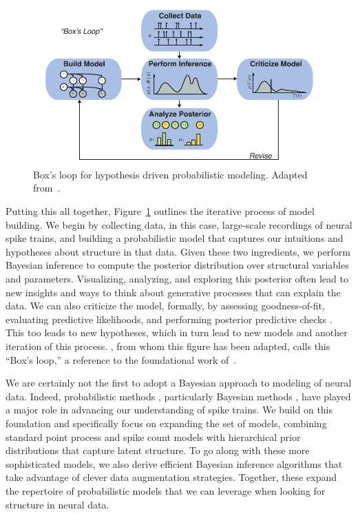 \begin{figure}[t]
  \centering%
\includegraphics[width=5.5in]{figures/ch1/boxloop} 
\caption[Box's Loop]{Box's loop for hypothesis driven probabilistic modeling.
Adapted from~\citet{blei2014build}.}
\label{fig:boxloop}
\end{figure}

Putting this all together, 
Figure~\ref{fig:boxloop} outlines the iterative process of model building.
We begin by collecting data, in this case, large-scale recordings of neural
spike trains, and building a probabilistic model that captures our 
intuitions and hypotheses about structure in that data. Given these two 
ingredients, we perform Bayesian inference to compute the posterior 
distribution over structural variables and parameters. Visualizing, analyzing, and 
exploring this posterior often lead to new insights and ways to think 
about generative processes that can explain the data. We can also 
criticize the model, formally, by assessing goodness-of-fit, evaluating 
predictive likelihoods, and performing posterior predictive checks 
\cite{Gelman13}. This too leads to new hypotheses, which in turn lead to 
new models and another iteration of this process.
\citet{blei2014build}, from whom this
figure has been adapted, calls this ``Box's loop,'' a reference to the 
foundational work of~\citet{box1980sampling}. 



We are certainly not the first to adopt a Bayesian approach to modeling 
of neural data. Indeed, probabilistic methods \cite[e.g.]{brillinger1976identification,
Brillinger-1988, Paninski-2004, Truccolo-2005, Pillow-2008}, 
particularly Bayesian methods \cite[e.g.]{sahani1999latent, rieke1999spikes, Yu09,
park2011bayesian, macke2011empirical}, 
have played a major role in advancing our understanding of spike trains. 
We build on this foundation and specifically focus on expanding the 
set of models, combining standard point process and spike count models with 
hierarchical prior distributions that capture latent structure. To go 
along with these more sophisticated models, we also derive efficient 
Bayesian inference algorithms that take advantage of clever data augmentation 
strategies. Together, these expand the repertoire of probabilistic models 
that we can leverage when looking for structure in neural data.


